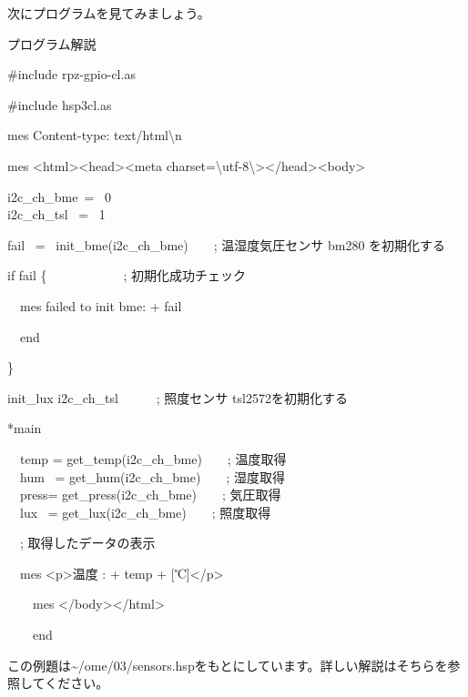\documentclass[a4paper,12pt,dvipdfmx]{jarticle}
\begin{document}
次にプログラムを見てみましょう。


\clearpage
プログラム解説



\centering
\begin{boxedminipage}{16.81cm}
\#include {\textquotedbl}rpz-gpio-cl.as{\textquotedbl}

\#include {\textquotedbl}hsp3cl.as{\textquotedbl}


\bigskip

mes {\textquotedbl}Content-type: text/html{\textbackslash}n{\textquotedbl}

mes {\textquotedbl}{\textless}html{\textgreater}{\textless}head{\textgreater}{\textless}meta
charset={\textbackslash}{\textquotedbl}utf-8{\textbackslash}{\textquotedbl}{\textgreater}{\textless}/head{\textgreater}{\textless}body{\textgreater}{\textquotedbl}


\bigskip

i2c\_ch\_bme\ = \ 0\\
i2c\_ch\_tsl \ = \ 1

\bigskip

fail \ = \ init\_bme(i2c\_ch\_bme)\ \ \ \ ; 温湿度気圧センサ bm280
を初期化する

if fail \{\ \ \ \ \ \ \ \ \ \ \ \   ; 初期化成功チェック

\ \ mes {\textquotedbl}failed to init bme: {\textquotedbl} + fail

\ \ end

\}


\bigskip

init\_lux i2c\_ch\_tsl\ \ \ \ \ \ ; 照度センサ
tsl2572を初期化する


\bigskip

*main


\bigskip

\ \ temp = get\_temp(i2c\_ch\_bme)\ \ \ \ ; 温度取得\\
\ \ hum \ = get\_hum(i2c\_ch\_bme)\ \ \ \ ; 湿度取得\\
\ \ press= get\_press(i2c\_ch\_bme)\ \ \ \ ; 気圧取得\\
\ \ lux \ = get\_lux(i2c\_ch\_bme)\ \ \ \ ; 照度取得\\


\bigskip


\bigskip

\ \ ; 取得したデータの表示

\ \ mes {\textquotedbl}{\textless}p{\textgreater}温度 : {\textquotedbl} + temp + {\textquotedbl}
[℃]{\textless}/p{\textgreater}{\textquotedbl}


\bigskip

\ \ \ \ mes {\textquotedbl}{\textless}/body{\textgreater}{\textless}/html{\textgreater}{\textquotedbl}

\ \ \ \ end
\end{boxedminipage}
\flushleft
この例題は\~{}/ome/03/sensors.hspをもとにしています。詳しい解説はそちらを参照してください。
\end{document}
